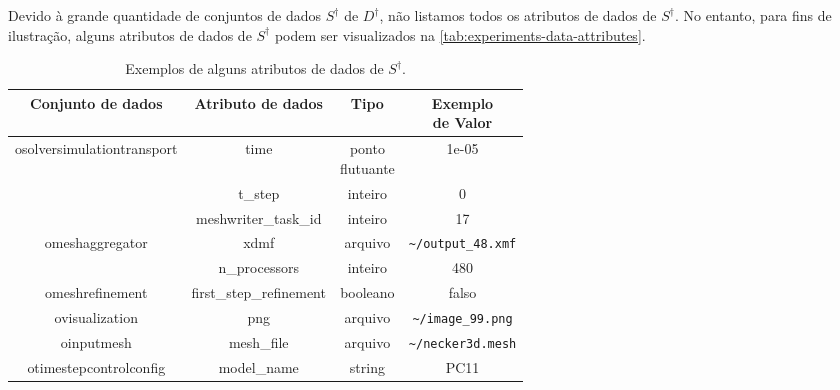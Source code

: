 Devido à grande quantidade de conjuntos de dados \(S^{\dagger}\) de \(D^{\dagger}\), não listamos todos os atributos de dados de \(S^{\dagger}\). No entanto, para fins de ilustração, alguns atributos de dados de \(S^{\dagger}\) podem ser visualizados na \autoref{tab:experiments-data-attributes}.

\begin{table}[htb]
    \centering
    \begin{tabular}{c|c|c|c}
\textbf{Conjunto de dados}                  & \textbf{Atributo de dados} & \textbf{Tipo}   & \makecell{\textbf{Exemplo} \\ \textbf{de Valor}}             \\ \hline
\multirow{3}{*}{osolversimulationtransport} & time                       & \makecell{ponto \\ flutuante} & 1e-05                                  \\ \cline{2-4}
                                            & t\_step                    & inteiro         & 0                                      \\ \cline{2-4}
                                            & meshwriter\_task\_id       & inteiro         & 17                                     \\ \hline
\multirow{2}{*}{omeshaggregator}            & xdmf                       & arquivo         & \texttt{\textasciitilde/output\_48.xmf}             \\ \cline{2-4}
                                            & n\_processors              & inteiro         & 480                                    \\ \hline
omeshrefinement                             & first\_step\_refinement    & booleano        & falso                                  \\ \hline
ovisualization                              & png                        & arquivo         & \texttt{\textasciitilde/image\_99.png} \\ \hline
oinputmesh                                  & mesh\_file                 & arquivo         & \texttt{\textasciitilde/necker3d.mesh}               \\ \hline
otimestepcontrolconfig                      & model\_name                & string          & PC11                                  
    \end{tabular}
    \caption[Exemplos de alguns atributos de dados de \(S^{\dagger}\)]{Exemplos de alguns atributos de dados de \(S^{\dagger}\).}%
    \label{tab:experiments-data-attributes}
\end{table}

